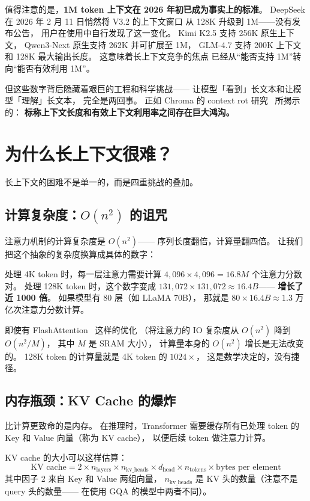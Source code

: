 值得注意的是，\textbf{1M token 上下文在 2026 年初已成为事实上的标准}。
DeepSeek 在 2026 年 2 月 11 日悄然将 V3.2 的上下文窗口
从 128K 升级到 1M——没有发布公告，
用户在使用中自行发现了这一变化。
Kimi K2.5 支持 256K 原生上下文，
Qwen3-Next 原生支持 262K 并可扩展至 1M，
GLM-4.7 支持 200K 上下文和 128K 最大输出长度。
这意味着长上下文竞争的焦点
已经从``能否支持 1M''转向``能否有效利用 1M''。

但这些数字背后隐藏着艰巨的工程和科学挑战——
让模型「看到」长文本和让模型「理解」长文本，
完全是两回事。
正如 Chroma 的 context rot 研究~\cite{chroma2025contextrot} 所揭示的：
\textbf{标称上下文长度和有效上下文利用率之间存在巨大鸿沟。}

\section{为什么长上下文很难？}

长上下文的困难不是单一的，而是四重挑战的叠加。

\subsection{计算复杂度：$O(n^2)$ 的诅咒}

注意力机制的计算复杂度是 $O(n^2)$——
序列长度翻倍，计算量翻四倍。
让我们把这个抽象的复杂度换算成具体的数字：

处理 4K token 时，每一层注意力需要计算
$4{,}096 \times 4{,}096 = 16.8M$ 个注意力分数对。
处理 128K token 时，这个数字变成
$131{,}072 \times 131{,}072 \approx 16.4B$——
\textbf{增长了近 1000 倍}。
如果模型有 80 层（如 LLaMA 70B），
那就是 $80 \times 16.4B \approx 1.3$ 万亿次注意力分数计算。

即使有 FlashAttention~\cite{dao2022flashattention} 这样的优化
（将注意力的 IO 复杂度从 $O(n^2)$ 降到 $O(n^2/M)$，
其中 $M$ 是 SRAM 大小），
计算量本身的 $O(n^2)$ 增长是无法改变的。
128K token 的计算量就是 4K token 的 $1024\times$，
这是数学决定的，没有捷径。

\subsection{内存瓶颈：KV Cache 的爆炸}

比计算更致命的是内存。
在推理时，Transformer 需要缓存所有已处理 token 的
Key 和 Value 向量（称为 KV cache），
以便后续 token 做注意力计算。

KV cache 的大小可以这样估算：
\begin{equation}
  \text{KV cache} = 2 \times n_{\text{layers}} \times n_{\text{kv\_heads}}
  \times d_{\text{head}} \times n_{\text{tokens}} \times \text{bytes per element}
  \label{eq:kv-cache-size}
\end{equation}
其中因子 2 来自 Key 和 Value 两组向量，
$n_{\text{kv\_heads}}$ 是 KV 头的数量（注意不是 query 头的数量——
在使用 GQA 的模型中两者不同）。

